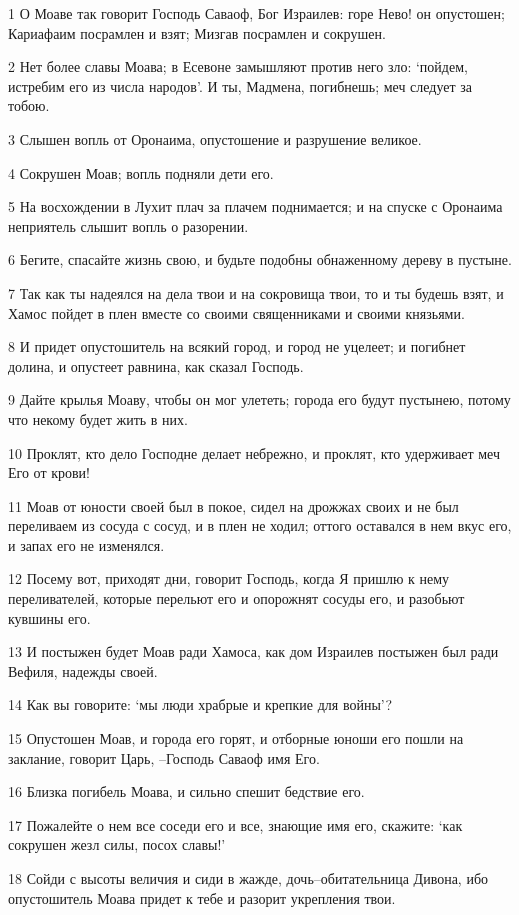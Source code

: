 \par 1 О Моаве так говорит Господь Саваоф, Бог Израилев: горе Нево! он опустошен; Кариафаим посрамлен и взят; Мизгав посрамлен и сокрушен.
\par 2 Нет более славы Моава; в Есевоне замышляют против него зло: `пойдем, истребим его из числа народов'. И ты, Мадмена, погибнешь; меч следует за тобою.
\par 3 Слышен вопль от Оронаима, опустошение и разрушение великое.
\par 4 Сокрушен Моав; вопль подняли дети его.
\par 5 На восхождении в Лухит плач за плачем поднимается; и на спуске с Оронаима неприятель слышит вопль о разорении.
\par 6 Бегите, спасайте жизнь свою, и будьте подобны обнаженному дереву в пустыне.
\par 7 Так как ты надеялся на дела твои и на сокровища твои, то и ты будешь взят, и Хамос пойдет в плен вместе со своими священниками и своими князьями.
\par 8 И придет опустошитель на всякий город, и город не уцелеет; и погибнет долина, и опустеет равнина, как сказал Господь.
\par 9 Дайте крылья Моаву, чтобы он мог улететь; города его будут пустынею, потому что некому будет жить в них.
\par 10 Проклят, кто дело Господне делает небрежно, и проклят, кто удерживает меч Его от крови!
\par 11 Моав от юности своей был в покое, сидел на дрожжах своих и не был переливаем из сосуда с сосуд, и в плен не ходил; оттого оставался в нем вкус его, и запах его не изменялся.
\par 12 Посему вот, приходят дни, говорит Господь, когда Я пришлю к нему переливателей, которые перельют его и опорожнят сосуды его, и разобьют кувшины его.
\par 13 И постыжен будет Моав ради Хамоса, как дом Израилев постыжен был ради Вефиля, надежды своей.
\par 14 Как вы говорите: `мы люди храбрые и крепкие для войны'?
\par 15 Опустошен Моав, и города его горят, и отборные юноши его пошли на заклание, говорит Царь, --Господь Саваоф имя Его.
\par 16 Близка погибель Моава, и сильно спешит бедствие его.
\par 17 Пожалейте о нем все соседи его и все, знающие имя его, скажите: `как сокрушен жезл силы, посох славы!'
\par 18 Сойди с высоты величия и сиди в жажде, дочь--обитательница Дивона, ибо опустошитель Моава придет к тебе и разорит укрепления твои.
